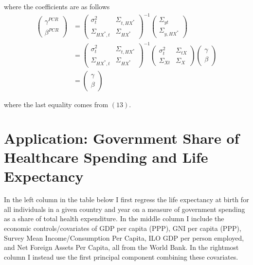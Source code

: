 \documentclass[12pt]{article}
\begin{document}
    where the coefficients are as follows
    \begin{align}
        \left(\begin{array}{l}
    {\gamma}^{PCR} \\
    {\beta}^{PCR}
    \end{array}\right)&=\left(\begin{array}{cc}
    {\sigma}^2_{t} & \Sigma_{t,HX^*} \\
    \Sigma_{HX^*,t} & {\Sigma}_{HX^*}
    \end{array}\right)^{-1}\left(\begin{array}{c}
    \Sigma_{yt} \\
    \Sigma_{y,HX^*}
    \end{array}\right)\\
    &=\left(\begin{array}{cc}
    {\sigma}^2_{t} & \Sigma_{t,HX^*} \\
    \Sigma_{HX^*,t} & {\Sigma}_{HX^*}
    \end{array}\right)^{-1}\left(\begin{array}{cc}
    {\sigma}^2_{t} & \Sigma_{tX} \\
    \Sigma_{Xt} & {\Sigma}_{X}
    \end{array}\right)\left(\begin{array}{l}
    {\gamma} \\
    {\beta}
    \end{array}\right)\\
    &=\left(\begin{array}{l}
    {\gamma} \\
    {\beta}
    \end{array}\right)
    \end{align}

    where the last equality comes from $(13)$.

    \newpage \clearpage

    \section*{Application: Government Share of Healthcare Spending and Life Expectancy}

    In the left column in the table below I first regress the life expectancy at birth for all individuals in a given country and year on a measure of government spending as a share of total health expenditure. In the middle column I include the economic controls/covariates of GDP per capita (PPP), GNI per capita (PPP), Survey Mean Income/Consumption Per Capita, ILO GDP per person employed, and Net Foreign Assets Per Capita, all from the World Bank. In the rightmost column I instead use the first principal component combining these covariates.
\end{document}
